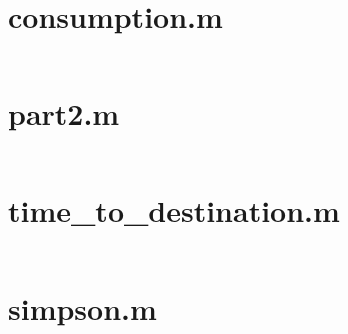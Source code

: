 \documentclass[]{scrreprt}
\begin{document}
\chapter{consumption.m}
\inputminted[linenos=true,frame=leftline]{matlab}{roadster/consumption.m}
\chapter{part2.m}
\inputminted[linenos=true,frame=leftline]{matlab}{roadster/part2.m}
\chapter{time\_to\_destination.m}
\inputminted[linenos=true,frame=leftline]{matlab}{roadster/time_to_destination.m}
\chapter{simpson.m}
\inputminted[linenos=true,frame=leftline]{matlab}{roadster/simpson.m}
\end{document}

